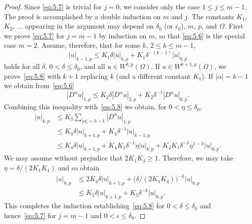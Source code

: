 \begin{proof}
  Since \eqref{eq:5.7} is trivial for $j=0$, we consider only the case $1\leq j\leq m-1$.
  The proof is accomplished by a double induction on $m$ and $j$.
  The constants $K_1$, $K_2$, $\ldots$ appearing in the argument may depend on $\delta_0$
  (or $\epsilon_0$), $m$, $p$, and $\Omega$. First we prove \eqref{eq:5.7} for $j=m-1$
  by induction on $m$, so that \eqref{eq:5.6} is the special case $m=2$. Assume, therefore,
  that for some $k$, $2\leq k\leq m-1$,
  \begin{equation}\label{eq:5.8}
    |u|_{k-1,p} \leq K_1 \delta |u|_{k,p} + K_1 \delta^{-(k-1)} |u|_{0,p}
  \end{equation}
  holds for all $\delta$, $0<\delta\leq\delta_0$, and all $u\in W^{k,p}(\Omega)$.
  If $u\in W^{k+1,p}(\Omega)$, we prove~\eqref{eq:5.8} with $k+1$ replacing $k$
  (and a different constant $K_1$). If $|\alpha|=k-1$ we obtain from~\eqref{eq:5.6}
  \[ |D^\alpha u|_{1,p} \leq K_2 \delta |D^\alpha u|_{2,p} + K_2 \delta^{-1} |D^\alpha u|_{0,p}. \]
  Combining this inequality with~\eqref{eq:5.8} we obtain, for $0<\eta\leq\delta_0$,
  \begin{align*}
    |u|_{k,p}
    & \leq K_3 \sum_{|\alpha|=k-1} |D^\alpha u|_{1,p} \\
    & \leq K_4 \delta |u|_{k+1,p} + K_4 \delta^{-1} |u|_{k-1,p} \\
    & \leq K_4 \delta |u|_{k+1,p} + K_4 K_1 \delta^{-1} \eta |u|_{k,p}
      + K_4 K_1 \delta^{-1} \eta^{1-k} |u|_{0,p}.
  \end{align*}
  We may assume without prejudice that $2K_1K_4\geq 1$. Therefore,
  we may take $\eta = \delta/(2K_1K_4)$ and so obtain
  \begin{align*}
    |u|_{k,p}
    & \leq 2 K_4 \delta |u|_{k+1,p} + \bigl(\delta / (2K_1K_4)\bigr)^{-k} |u|_{0,p} \\
    & \leq K_5 \delta |u|_{k+1,p} + K_5 \delta^{-k} |u|_{0,p}.
  \end{align*}
  This completes the induction establishing~\eqref{eq:5.8} for $0<\delta\leq\delta_0$
  and hence~\eqref{eq:5.7} for $j=m-1$ and $0<\epsilon\leq\delta_0$.


\end{proof}
